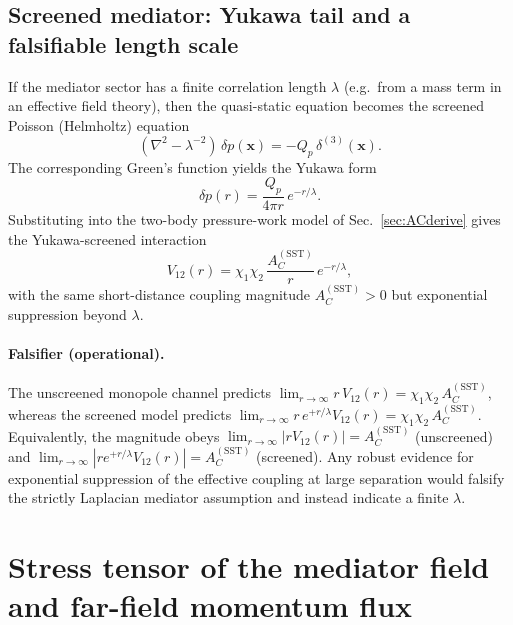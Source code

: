 \documentclass[pdflatex,sn-mathphys-num]{revtex4-2}
\begin{document}
    \subsection{Screened mediator: Yukawa tail and a falsifiable length scale}
        If the mediator sector has a finite correlation length \(\lambda\) (e.g.\ from a mass term in an effective field theory),
        then the quasi-static equation becomes the screened Poisson (Helmholtz) equation
        \begin{equation}
            (\nabla^2-\lambda^{-2})\,\delta p(\mathbf{x}) = -Q_p\,\delta^{(3)}(\mathbf{x}).
            \label{eq:helmholtz}
        \end{equation}
        The corresponding Green's function yields the Yukawa form
        \begin{equation}
            \delta p(r)=\frac{Q_p}{4\pi r}\,e^{-r/\lambda}.
            \label{eq:yukawa_dp}
        \end{equation}
        Substituting into the two-body pressure-work model of Sec.~\ref{sec:ACderive} gives the Yukawa-screened interaction
        \begin{equation}
            V_{12}(r)= \chi_1\chi_2\,\frac{A_C^{\mathrm{(SST)}}}{r}\,e^{-r/\lambda},
            \label{eq:yukawa_V}
        \end{equation}
        with the same short-distance coupling magnitude \(A_C^{\mathrm{(SST)}}>0\) but exponential suppression beyond \(\lambda\).

        \paragraph{Falsifier (operational).}
            The unscreened monopole channel predicts
            \(\lim_{r\to\infty} r\,V_{12}(r)=\chi_1\chi_2\,A_C^{\mathrm{(SST)}}\),
            whereas the screened model predicts
            \(\lim_{r\to\infty} r\,e^{+r/\lambda}V_{12}(r)=\chi_1\chi_2\,A_C^{\mathrm{(SST)}}\).
            Equivalently, the magnitude obeys \(\lim_{r\to\infty} |rV_{12}(r)|=A_C^{\mathrm{(SST)}}\) (unscreened) and
            \(\lim_{r\to\infty} |r e^{+r/\lambda}V_{12}(r)|=A_C^{\mathrm{(SST)}}\) (screened).
            Any robust evidence for exponential suppression of the effective coupling at large
            separation would falsify the strictly Laplacian mediator assumption and instead indicate a finite \(\lambda\).

    \section{Stress tensor of the mediator field and far-field momentum flux}
    \label{app:stress}
\end{document}
